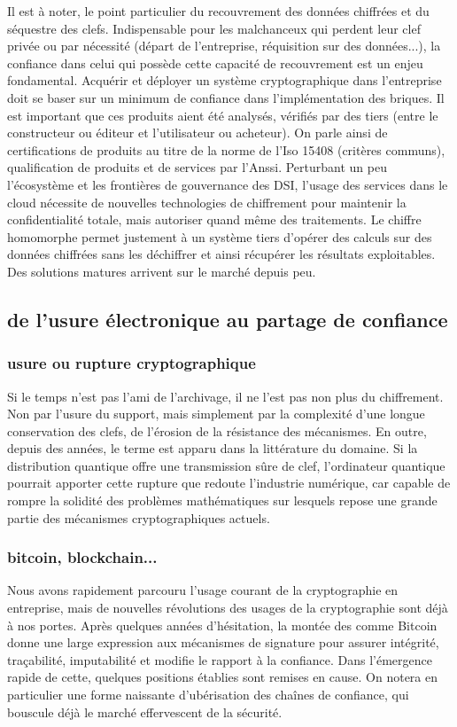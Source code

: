  Il est à noter, le point particulier du recouvrement des données chiffrées et du séquestre des clefs. Indispensable pour les malchanceux qui perdent leur clef privée ou par nécessité (départ de l'entreprise, réquisition sur des données...), la confiance dans celui qui possède cette capacité de recouvrement est un enjeu fondamental.
Acquérir et déployer un système cryptographique dans l'entreprise doit se baser sur un minimum de confiance dans
l'implémentation des briques. Il est important que ces produits aient été analysés, vérifiés par des tiers (entre le constructeur ou éditeur et l'utilisateur ou acheteur). On parle ainsi de certifications de produits au titre de la norme de l'Iso 15408 (critères communs), qualification de produits et de services par l'Anssi. Perturbant un peu l'écosystème et les frontières de gouvernance des DSI, l'usage des services dans le cloud nécessite de nouvelles technologies de chiffrement pour maintenir la confidentialité totale, mais autoriser quand même des traitements. Le chiffre homomorphe permet justement à un système tiers d'opérer des calculs sur des données chiffrées sans les déchiffrer et ainsi récupérer les résultats exploitables. Des solutions matures arrivent sur le marché depuis peu.


\subsection{de l'usure électronique au partage de confiance}

\subsubsection{usure ou rupture cryptographique}
Si le temps n'est pas l'ami de l'archivage, il ne l'est pas non plus du chiffrement. Non par l'usure du support, mais simplement par la complexité d'une longue conservation des clefs, de l'érosion de la résistance des mécanismes. En outre, depuis des années, le terme est apparu dans la littérature du domaine. Si la distribution quantique offre une transmission sûre de clef, l'ordinateur quantique pourrait apporter cette rupture que redoute l'industrie numérique, car capable de rompre la solidité des problèmes mathématiques sur lesquels repose une grande partie des mécanismes cryptographiques actuels.
\subsubsection{ bitcoin, blockchain...}
Nous avons rapidement parcouru l'usage courant de la cryptographie en entreprise, mais de nouvelles révolutions des usages de la cryptographie sont déjà à nos portes. Après quelques années d'hésitation, la montée des comme Bitcoin donne une large expression aux mécanismes de signature pour assurer intégrité, traçabilité, imputabilité et modifie le rapport à la confiance. Dans l'émergence rapide de cette, quelques positions établies sont remises en cause. On notera en particulier une forme naissante d'ubérisation des chaînes de confiance, qui bouscule déjà le marché effervescent de la sécurité. 

